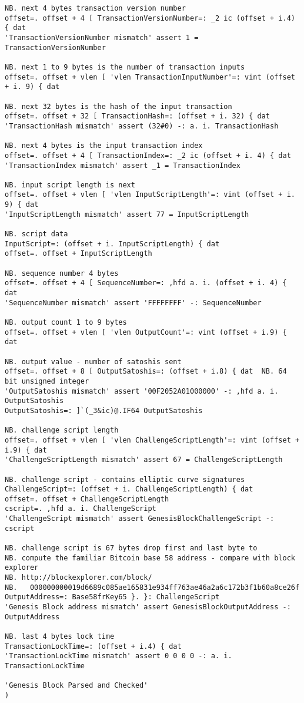 \begin{tcolorbox}[breakable, size=fbox, boxrule=1pt, pad at break*=1mm,colback=cellbackground, colframe=cellborder]
\begin{lstlisting}[language=jdoc, frame=single,framerule=0pt,label=lst:scr4754X0]
NB. next 4 bytes transaction version number
offset=. offset + 4 [ TransactionVersionNumber=: _2 ic (offset + i.4) { dat
'TransactionVersionNumber mismatch' assert 1 = TransactionVersionNumber

NB. next 1 to 9 bytes is the number of transaction inputs
offset=. offset + vlen [ 'vlen TransactionInputNumber'=: vint (offset + i. 9) { dat

NB. next 32 bytes is the hash of the input transaction
offset=. offset + 32 [ TransactionHash=: (offset + i. 32) { dat
'TransactionHash mismatch' assert (32#0) -: a. i. TransactionHash

NB. next 4 bytes is the input transaction index
offset=. offset + 4 [ TransactionIndex=: _2 ic (offset + i. 4) { dat
'TransactionIndex mismatch' assert _1 = TransactionIndex

NB. input script length is next
offset=. offset + vlen [ 'vlen InputScriptLength'=: vint (offset + i. 9) { dat
'InputScriptLength mismatch' assert 77 = InputScriptLength

NB. script data
InputScript=: (offset + i. InputScriptLength) { dat
offset=. offset + InputScriptLength 

NB. sequence number 4 bytes
offset=. offset + 4 [ SequenceNumber=: ,hfd a. i. (offset + i. 4) { dat
'SequenceNumber mismatch' assert 'FFFFFFFF' -: SequenceNumber

NB. output count 1 to 9 bytes
offset=. offset + vlen [ 'vlen OutputCount'=: vint (offset + i.9) { dat

NB. output value - number of satoshis sent
offset=. offset + 8 [ OutputSatoshis=: (offset + i.8) { dat  NB. 64 bit unsigned integer
'OutputSatoshis mismatch' assert '00F2052A01000000' -: ,hfd a. i. OutputSatoshis
OutputSatoshis=: ]`(_3&ic)@.IF64 OutputSatoshis

NB. challenge script length
offset=. offset + vlen [ 'vlen ChallengeScriptLength'=: vint (offset + i.9) { dat
'ChallengeScriptLength mismatch' assert 67 = ChallengeScriptLength

NB. challenge script - contains elliptic curve signatures
ChallengeScript=: (offset + i. ChallengeScriptLength) { dat
offset=. offset + ChallengeScriptLength 
cscript=. ,hfd a. i. ChallengeScript
'ChallengeScript mismatch' assert GenesisBlockChallengeScript -: cscript

NB. challenge script is 67 bytes drop first and last byte to
NB. compute the familiar Bitcoin base 58 address - compare with block explorer
NB. http://blockexplorer.com/block/
NB.   000000000019d6689c085ae165831e934ff763ae46a2a6c172b3f1b60a8ce26f
OutputAddress=: Base58frKey65 }. }: ChallengeScript
'Genesis Block address mismatch' assert GenesisBlockOutputAddress -: OutputAddress

NB. last 4 bytes lock time
TransactionLockTime=: (offset + i.4) { dat
'TransactionLockTime mismatch' assert 0 0 0 0 -: a. i. TransactionLockTime

'Genesis Block Parsed and Checked'
)
\end{lstlisting}
\end{tcolorbox}



%